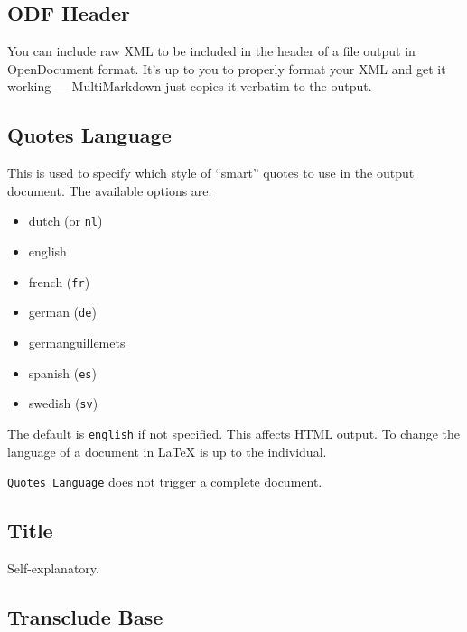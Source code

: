 \subsection{ODF Header }
\label{odfheader}

You can include raw XML to be included in the header of a file output in
OpenDocument format. It's up to you to properly format your XML and get it
working --- MultiMarkdown just copies it verbatim to the output.

\subsection{Quotes Language }
\label{quoteslanguage}

This is used to specify which style of ``smart'' quotes to use in the output document. The available options are:

\begin{itemize}
\item dutch (or \texttt{nl})

\item english

\item french (\texttt{fr})

\item german (\texttt{de})

\item germanguillemets

\item spanish (\texttt{es})

\item swedish (\texttt{sv})

\end{itemize}

The default is \texttt{english} if not specified. This affects HTML output. To
change the language of a document in LaTeX is up to the individual.

\texttt{Quotes Language} does not trigger a complete document.

\subsection{Title }
\label{title}

Self-explanatory.

\subsection{Transclude Base }
\label{transcludebase}


